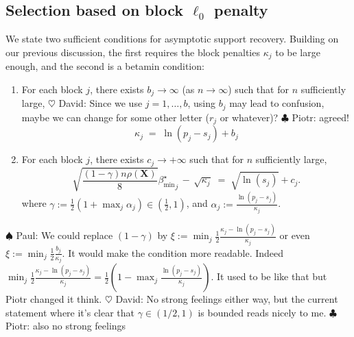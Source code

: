\documentclass[aos]{imsart}
\theoremstyle{plain}
\newcommand{\david}[1]{{\small{\color{blue} \sf $\heartsuit$ David: #1}}}
\newcommand{\piotr}[1]{{\small{\color{red} \sf $\clubsuit$ Piotr: #1}}}
\newcommand{\paul}[1]{{\small{\color{green} \sf $\spadesuit$ Paul: #1}}}
\newcommand{\bs}{\boldsymbol}
\begin{document}
\subsection{Selection based on block $\ell_0$ penalty}
\label{ssec:regression_mainresult}

We state two sufficient conditions for asymptotic support recovery. %
Building on our previous discussion, the first requires the block penalties $\kappa_j$ to be large enough, %
and the second is a betamin condition: 
\begin{enumerate}[start=6,label={(A\arabic*)}]
    \item For each block $j$, there exists $b_{j}\to \infty$ (as $n\to \infty$) such that for $n$ sufficiently large, %
    \david{Since we use $j=1,\ldots,b$, using $b_j$ may lead to confusion, maybe we can change for some other letter ($r_j$ or whatever)?}\piotr{agreed!}
\begin{equation}\label{cond:suffIreg}
    \kappa_j \;=\;\ln(p_j-s_j) + b_{j}
\end{equation}\item For each block $j$, there exists $c_{j}\to +\infty$ such that for $n$ sufficiently large, %
    \begin{equation}\label{cond:suffIIreg}
        \sqrt{\frac{(1-\gamma) n\rho(\bs X)}{8}}{{\beta_{\min}^{\star}}_j} \,- \,\sqrt{\kappa_j} \;=\; \sqrt{\ln(s_j)} + c_{j} .
    \end{equation}
where $\gamma:=\frac12(1+\max_j \alpha_j)\in (\tfrac12,1)$, and
$\alpha_j:=\frac{\ln(p_j-s_j)}{\kappa_j}$.
\end{enumerate}
\paul{We could replace $(1-\gamma)$ by $\xi:=\min_j \tfrac{1}{2}\tfrac{\kappa_j-\ln(p_j-s_j)}{\kappa_j}$ or even $\xi:=\min_j \tfrac{1}{2}\tfrac{b_j}{\kappa_j}$. It would make the condition more readable. Indeed $\min_j \tfrac{1}{2}\tfrac{\kappa_j-\ln(p_j-s_j)}{\kappa_j} = \tfrac{1}{2}(1-\max_j\tfrac{\ln(p_j-s_j)}{\kappa_j})$. It used to be like that but Piotr changed it think.}
\david{No strong feelings either way, but the current statement where it's clear that $\gamma \in (1/2,1)$ is bounded reads nicely to me.}\piotr{also no strong feelings}
\end{document}
